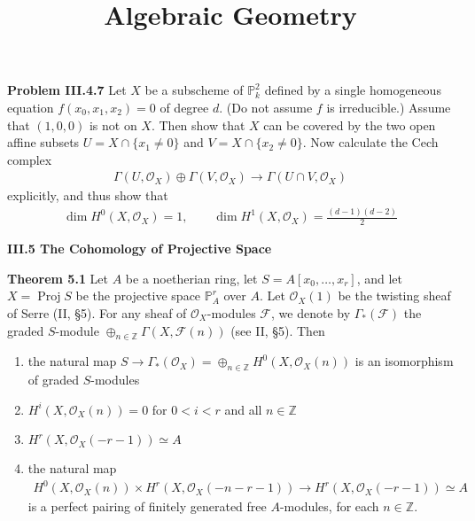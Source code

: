 \documentclass[hidelinks, 12pt]{article}
\title{Algebraic Geometry}
\date{}
\DeclareMathOperator{\Proj}{Proj}
\theoremstyle{mydefstyle}
\theoremstyle{mythmstyle}
\begin{document}
\pagecolor{white}

\textbf{Problem III.4.7} Let $X$ be a subscheme of $\mathbb{P}^2_k$ defined by a single homogeneous equation $f(x_0, x_1, x_2) = 0$ of degree $d$. (Do not assume $f$ is irreducible.) Assume that $(1, 0, 0)$ is not on $X$. Then show that $X$ can be covered by the two open affine subsets $U = X \cap \{x_1 \ne 0\}$ and $V = X \cap \{x_2 \ne 0\}$. Now calculate the Cech complex
\begin{gather*}
\Gamma(U, \mathcal{O}_X) \oplus \Gamma(V, \mathcal{O}_X) \to \Gamma(U \cap V, \mathcal{O}_X)
\end{gather*}
explicitly, and thus show that
\begin{gather*}
\dim H^0(X, \mathcal{O}_X) = 1, \qquad \dim H^1(X, \mathcal{O}_X) = \frac{(d-1)(d-2)}{2}
\end{gather*}

\textbf{III.5 The Cohomology of Projective Space}

\textbf{Theorem 5.1}  Let $A$ be a noetherian ring, let $S = A[x_0, \dots, x_r]$, and let $X = \Proj S$ be the projective space $\mathbb{P}^r_A$ over $A$. Let $\mathcal{O}_X(1)$ be the twisting sheaf of Serre (II, \S 5). For any sheaf of $\mathcal{O}_X$-modules $\mathcal{F}$, we denote by $\Gamma_*(\mathcal{F})$ the graded $S$-module $\oplus_{n\in\mathbb{Z}}\Gamma(X, \mathcal{F}(n))$ (see II, \S 5). Then
\begin{enumerate}[(\alph*)]
\item the natural map $S \to \Gamma_*(\mathcal{O}_X) = \oplus_{n\in\mathbb{Z}}H^0(X, \mathcal{O}_X(n))$ is an isomorphism of graded $S$-modules
\item $H^i(X, \mathcal{O}_X(n)) = 0$ for $0 < i < r$ and all $n \in \mathbb{Z}$
\item $H^r(X, \mathcal{O}_X(-r-1)) \simeq A$
\item the natural map
\begin{gather*}
H^0(X, \mathcal{O}_X(n)) \times H^r(X, \mathcal{O}_X(-n-r-1)) \to H^r(X, \mathcal{O}_X(-r-1)) \simeq A
\end{gather*}
is a perfect pairing of finitely generated free $A$-modules, for each $n \in \mathbb{Z}$.
\end{enumerate}
\end{document}
